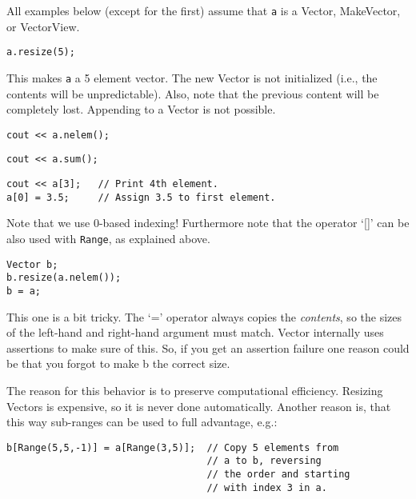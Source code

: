 
All examples below (except for the first) assume that \verb|a| is a
Vector, MakeVector, or VectorView.

\begin{verbatim}
a.resize(5);
\end{verbatim}
This makes \verb|a| a 5 element vector. The new Vector is not
initialized (i.e., the contents will be unpredictable). Also, note
that the previous content will be completely lost. Appending to a
Vector is not possible.

\begin{verbatim}
cout << a.nelem();
\end{verbatim}

\begin{verbatim}
cout << a.sum();
\end{verbatim}

\begin{verbatim}
cout << a[3];   // Print 4th element.
a[0] = 3.5;     // Assign 3.5 to first element.
\end{verbatim}

Note that we use 0-based indexing! Furthermore note that the operator
`[]' can be also used with \verb|Range|, as explained above.

\begin{verbatim}
Vector b;
b.resize(a.nelem());
b = a;
\end{verbatim}

This one is a bit tricky. The `=' operator always copies the
\emph{contents}, so the sizes of the left-hand and right-hand argument
must match. Vector internally uses assertions to make sure of
this. So, if you get an assertion failure one reason could be that you
forgot to make b the correct size.

The reason for this behavior is to preserve computational
efficiency. Resizing Vectors is expensive, so it is never done
automatically. Another reason is, that this way sub-ranges can be used
to full advantage, e.g.:

\begin{verbatim}
b[Range(5,5,-1)] = a[Range(3,5)];  // Copy 5 elements from 
                                   // a to b, reversing 
                                   // the order and starting
                                   // with index 3 in a.
\end{verbatim}

